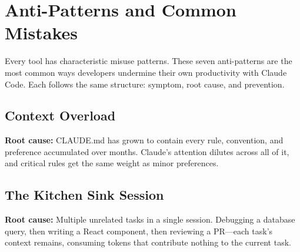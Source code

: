 \chapter{Anti-Patterns and Common Mistakes}
\label{ch:antipatterns}

Every tool has characteristic misuse patterns.
These seven anti-patterns are the most common ways developers
undermine their own productivity with Claude Code.
Each follows the same structure: symptom, root cause, and prevention.

\section{Context Overload}



\textbf{Root cause:} CLAUDE.md has grown to contain every rule, convention,
and preference accumulated over months. Claude's attention dilutes
across all of it, and critical rules get the same weight as minor preferences.

\section{The Kitchen Sink Session}


\textbf{Root cause:} Multiple unrelated tasks in a single session.
Debugging a database query, then writing a React component, then
reviewing a PR---each task's context remains, consuming tokens
that contribute nothing to the current task.

